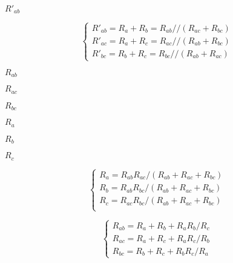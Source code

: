 {\newpage\clearpage
{}%
$R'_{ab}$%
\lthtmlinlinemathZ
\lthtmlcheckvsize\clearpage}

{\newpage\clearpage
{}%
\begin{displaymath} \left\{ \begin{array}{rr}
	R'_{ab}=R_a+R_b=R_{ab}//(R_{ac}+R_{bc})	\\
	R'_{ac}=R_a+R_c=R_{ac}//(R_{ab}+R_{bc}) \\
	R'_{bc}=R_b+R_c=R_{bc}//(R_{ab}+R_{ac}) \end{array} \right. \end{displaymath}%
\lthtmldisplayZ
\lthtmlcheckvsize\clearpage}

{\newpage\clearpage
{}%
$R_{ab}$%
\lthtmlinlinemathZ
\lthtmlcheckvsize\clearpage}

{\newpage\clearpage
{}%
$R_{ac}$%
\lthtmlinlinemathZ
\lthtmlcheckvsize\clearpage}

{\newpage\clearpage
{}%
$R_{bc}$%
\lthtmlinlinemathZ
\lthtmlcheckvsize\clearpage}

{\newpage\clearpage
{}%
$R_a$%
\lthtmlinlinemathZ
\lthtmlcheckvsize\clearpage}

{\newpage\clearpage
{}%
$R_b$%
\lthtmlinlinemathZ
\lthtmlcheckvsize\clearpage}

{\newpage\clearpage
{}%
$R_c$%
\lthtmlinlinemathZ
\lthtmlcheckvsize\clearpage}

{\newpage\clearpage
{}%
\begin{displaymath} \left\{ \begin{array}{rr}
      R_a=R_{ab}R_{ac}/(R_{ab}+R_{ac}+R_{bc}) \\
      R_b=R_{ab}R_{bc}/(R_{ab}+R_{ac}+R_{bc}) \\
      R_c=R_{ac}R_{bc}/(R_{ab}+R_{ac}+R_{bc}) \\
    \end{array} \right. \end{displaymath}%
\lthtmldisplayZ
\lthtmlcheckvsize\clearpage}

{\newpage\clearpage
{}%
\begin{displaymath} \left\{ \begin{array}{rr}
      R_{ab}=R_a+R_b+R_aR_b/R_c	\\
      R_{ac}=R_a+R_c+R_aR_c/R_b	\\
      R_{bc}=R_b+R_c+R_bR_c/R_a	\end{array} \right. \end{displaymath}%
\lthtmldisplayZ
\lthtmlcheckvsize\clearpage}

